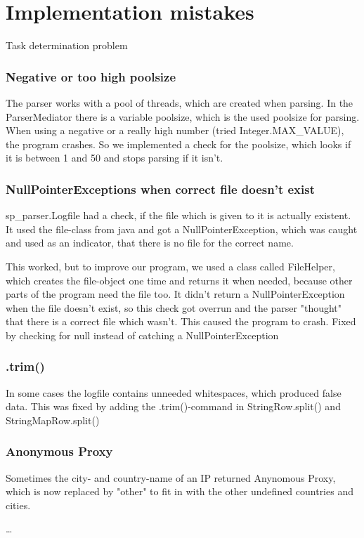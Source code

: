 \section{Implementation mistakes}

Task determination problem

\subsubsection{Negative or too high poolsize}
The parser works with a pool of threads, which are created when parsing. In the ParserMediator there is
a variable poolsize, which is the used poolsize for parsing.
When using a negative or a really high number (tried Integer.MAX_VALUE), the program crashes.
So we implemented a check for the poolsize, which looks if it is between 1 and 50 and stops parsing if it isn't.

\subsubsection{NullPointerExceptions when correct file doesn't exist}
sp_parser.Logfile had a check, if the file which is given to it is actually existent. It used the file-class from java
and got a NullPointerException, which was caught and used as an indicator, that there is no file for the correct name.

This worked, but to improve our program, we used a class called FileHelper, which creates the file-object one time and
returns it when needed, because other parts of the program need the file too. It didn't return a NullPointerException when 
the file doesn't exist, so this check got overrun and the parser "thought" that there is a correct file which wasn't.
This caused the program to crash. Fixed by checking for null instead of catching a NullPointerException

\subsubsection{.trim()}
In some cases the logfile contains unneeded whitespaces, which produced false data. This was fixed by adding the .trim()-command
in StringRow.split() and StringMapRow.split()

\subsubsection{Anonymous Proxy}
Sometimes the city- and country-name of an IP returned Anynomous Proxy, which is now replaced by "other" to fit in with 
the other undefined countries and cities.


\ldots
